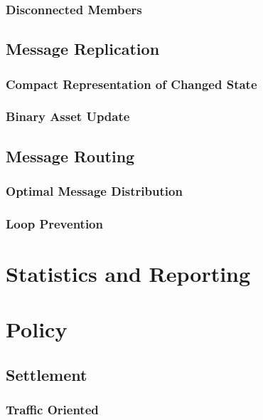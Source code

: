 \subsubsection{Disconnected Members}

\subsection{Message Replication}

  \subsubsection{Compact Representation of Changed State}
  
  \subsubsection{Binary Asset Update}
  
\subsection{Message Routing}

  \subsubsection{Optimal Message Distribution}
 
  \subsubsection{Loop Prevention}

\section{Statistics and Reporting}

\section{Policy}

\subsection{Settlement}

\subsubsection{Traffic Oriented}

